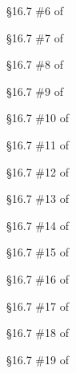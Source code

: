 \begin{problem}[15 points]
	\S 16.7 \#6 of \cite {tw}
\end{problem}

\begin{problem}[15 points]
	\S 16.7 \#7 of \cite {tw}
\end{problem}

\begin{problem}[10 points]
	\S 16.7 \#8 of \cite {tw}
\end{problem}

\begin{problem}[20 points]
	\S 16.7 \#9 of \cite {tw}
\end{problem}

\begin{problem}[10 points]
	\S 16.7 \#10 of \cite {tw}
\end{problem}

\begin{problem}[15 points]
	\S 16.7 \#11 of \cite {tw}
\end{problem}

\begin{problem}[15 points]
	\S 16.7 \#12 of \cite {tw}
\end{problem}

\begin{problem}[15 points]
	\S 16.7 \#13 of \cite {tw}
\end{problem}

\begin{problem}[20 points]
	\S 16.7 \#14 of \cite {tw}
\end{problem}

\begin{problem}[20 points]
	\S 16.7 \#15 of \cite {tw}
\end{problem}

\begin{problem}[15 points]
	\S 16.7 \#16 of \cite {tw}
\end{problem}

\begin{problem}[15 points]
	\S 16.7 \#17 of \cite {tw}
\end{problem}

\begin{problem}[15 points]
	\S 16.7 \#18 of \cite {tw}
\end{problem}

\begin{problem}[15 points]
	\S 16.7 \#19 of \cite {tw}
\end{problem}

